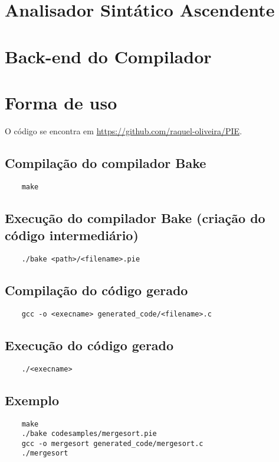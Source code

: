 \documentclass[12pt]{report}
\begin{document}
\newpage
\chapter{Analisador Sintático Ascendente}


\newpage
\chapter{Back-end do Compilador}


\newpage
\chapter{Forma de uso}\label{ch:uso}
O código se encontra em \url{https://github.com/raquel-oliveira/PIE}.
\section{Compilação do compilador Bake}
\begin{verbatim}
    make
\end{verbatim}

\section{Execução do compilador Bake (criação do código intermediário)}
\begin{verbatim}
    ./bake <path>/<filename>.pie
\end{verbatim}

\section{Compilação do código gerado} 
\begin{verbatim}
    gcc -o <execname> generated_code/<filename>.c
\end{verbatim}

\section{Execução do código gerado}
\begin{verbatim}
    ./<execname>
\end{verbatim}

\section{Exemplo}

\begin{verbatim}
    make
    ./bake codesamples/mergesort.pie
    gcc -o mergesort generated_code/mergesort.c
    ./mergesort
\end{verbatim}
\end{document}
